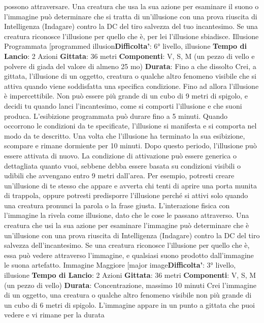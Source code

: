 \begin{multicols}{2}
possono attraversare.
Una creatura che usa la sua azione per esaminare il
suono o l’immagine può determinare che si tratta di
un’illusione con una prova riuscita di Intelligenza
(Indagare) contro la DC del tiro salvezza del tuo
incantesimo. Se una creatura riconosce l’illusione per
quello che è, per lei l’illusione sbiadisce.
Illusione Programmata
[programmed illusion\textbf{Difficolta'}:
6° livello, illusione
\textbf{Tempo di Lancio}: 2 Azioni
\textbf{Gittata}: 36 metri
\textbf{Componenti}: V, S, M (un pezzo di vello e polvere di
giada del valore di almeno 25 mo)
\textbf{Durata}: Fino a che dissolto
Crei, a gittata, l’illusione di un oggetto, creatura o
qualche altro fenomeno visibile che si attiva quando
viene soddisfatta una specifica condizione. Fino ad
allora l’illusione è impercettibile. Non può essere più
grande di un cubo di 9 metri di spigolo, e decidi tu
quando lanci l’incantesimo, come si comporti l’illusione
e che suoni produca. L’esibizione programmata può
durare fino a 5 minuti.
Quando occorrono le condizioni da te specificate,
l’illusione si manifesta e si comporta nel modo da te
descritto. Una volta che l’illusione ha terminato la sua
esibizione, scompare e rimane dormiente per 10 minuti.
Dopo questo periodo, l’illusione può essere attivata di
nuovo.
La condizione di attivazione può essere generica o
dettagliata quanto vuoi, sebbene debba essere basata
su condizioni visibili o udibili che avvengano entro 9
metri dall’area. Per esempio, potresti creare un’illusione
di te stesso che appare e avverta chi tenti di aprire una
porta munita di trappola, oppure potresti predisporre
l’illusione perché si attivi solo quando una creatura
pronunci la parola o la frase giusta.
L’interazione fisica con l’immagine la rivela come
illusione, dato che le cose le passano attraverso. Una
creatura che usi la sua azione per esaminare
l’immagine può determinare che è un’illusione con una
prova riuscita di Intelligenza (Indagare) contro la DC del
tiro salvezza dell’incantesimo. Se una creatura
riconosce l’illusione per quello che è, essa può vedere
attraverso l’immagine, e qualsiasi suono prodotto
dall’immagine le suona artefatto.
Immagine Maggiore
[major image\textbf{Difficolta'}:
3° livello, illusione
\textbf{Tempo di Lancio}: 2 Azioni
\textbf{Gittata}: 36 metri
\textbf{Componenti}: V, S, M (un pezzo di vello)
\textbf{Durata}: Concentrazione, massimo 10 minuti
Crei l’immagine di un oggetto, una creatura o qualche
altro fenomeno visibile non più grande di un cubo di 6
metri di spigolo. L’immagine appare in un punto a
gittata che puoi vedere e vi rimane per la durata

\end{multicols}
